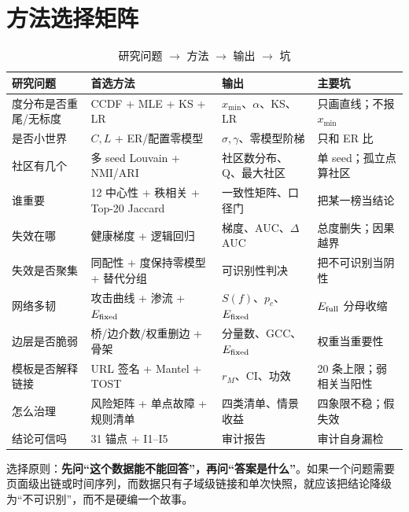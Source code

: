 \section{方法选择矩阵}

\begin{table}[H]
\centering
\caption{研究问题 \(\to\) 方法 \(\to\) 输出 \(\to\) 坑}
\small
\begin{tabularx}{\textwidth}{@{}p{}p{}p{}X@{}}
\toprule
研究问题 & 首选方法 & 输出 & 主要坑 \\
\midrule
度分布是否重尾/无标度 & CCDF + MLE + KS + LR & \(x_{\min}\)、\(\alpha\)、KS、LR & 只画直线；不报 \(x_{\min}\) \\
是否小世界 & \(C,L\) + ER/配置零模型 & \(\sigma,\gamma\)、零模型阶梯 & 只和 ER 比 \\
社区有几个 & 多 seed Louvain + NMI/ARI & 社区数分布、Q、最大社区 & 单 seed；孤立点算社区 \\
谁重要 & 12 中心性 + 秩相关 + Top-20 Jaccard & 一致性矩阵、口径门 & 把某一榜当结论 \\
失效在哪 & 健康梯度 + 逻辑回归 & 梯度、AUC、\(\Delta\)AUC & 总度删失；因果越界 \\
失效是否聚集 & 同配性 + 度保持零模型 + 替代分组 & 可识别性判决 & 把不可识别当阴性 \\
网络多韧 & 攻击曲线 + 渗流 + \(E_{\mathrm{fixed}}\) & \(S(f)\)、\(p_c\)、\(E_{\mathrm{fixed}}\) & \(E_{\mathrm{full}}\) 分母收缩 \\
边层是否脆弱 & 桥/边介数/权重删边 + 骨架 & 分量数、GCC、\(E_{\mathrm{fixed}}\) & 权重当重要性 \\
模板是否解释链接 & URL 签名 + Mantel + TOST & \(r_M\)、CI、功效 & 20 条上限；弱相关当阳性 \\
怎么治理 & 风险矩阵 + 单点故障 + 规则清单 & 四类清单、情景收益 & 四象限不稳；假失效 \\
结论可信吗 & 31 锚点 + I1--I5 & 审计报告 & 审计自身漏检 \\
\bottomrule
\end{tabularx}
\end{table}

\noindent
选择原则：\textbf{先问“这个数据能不能回答”，再问“答案是什么”}。如果一个问题需要页面级出链或时间序列，而数据只有子域级链接和单次快照，就应该把结论降级为“不可识别”，而不是硬编一个故事。

